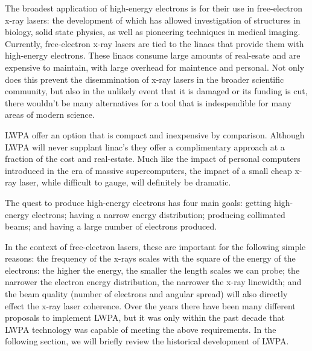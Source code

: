 \documentclass[12pt,letter]{article}
\begin{document}
 
 The broadest application of high-energy electrons is for their use in
 free-electron x-ray lasers: the development of
 which has allowed investigation of structures in biology, solid state
 physics, as well as pioneering techniques in medical imaging.\cite{o2001free}
 Currently, free-electron x-ray lasers are tied to the linacs that provide them
 with
 high-energy electrons. These linacs consume large amounts of real-esate
 and are expensive to maintain, with large overhead for maintence and
 personal. Not only does this prevent the disemmination of x-ray lasers in the
 broader scientific community, but also in the unlikely event that it is
 damaged or its funding is cut, there wouldn't be many alternatives for a tool that
 is indespendible for many areas of modern science.
 

 LWPA offer an option that is compact and inexpensive by
 comparison. Although LWPA will never supplant linac's they offer a complimentary approach at a
 fraction of the cost and real-estate. Much like the impact of personal
 computers introduced in the era of massive supercomputers, the impact of a
 small cheap x-ray laser, while difficult to gauge, will definitely be dramatic.


 The quest to produce high-energy electrons has four main goals: getting
  high-energy electrons; having a narrow energy distribution; producing collimated beams; and having a large number of electrons
 produced.

 In the context of free-electron lasers, these are important for the following
 simple reasons: the frequency of the x-rays scales with the square of the
 energy of the electrons: the higher the energy, the smaller the length scales we
 can probe; the narrower the electron energy distribution, the narrower the
 x-ray linewidth; and the beam quality (number of electrons and angular spread)
 will also directly effect the x-ray laser coherence.\cite{} Over the years
 there have been many different proposals to implement LWPA, but it was only
 within the past decade that LWPA technology was capable of meeting the above
 requirements. In the following section, we will briefly review the historical development of LWPA. 
\end{document}
